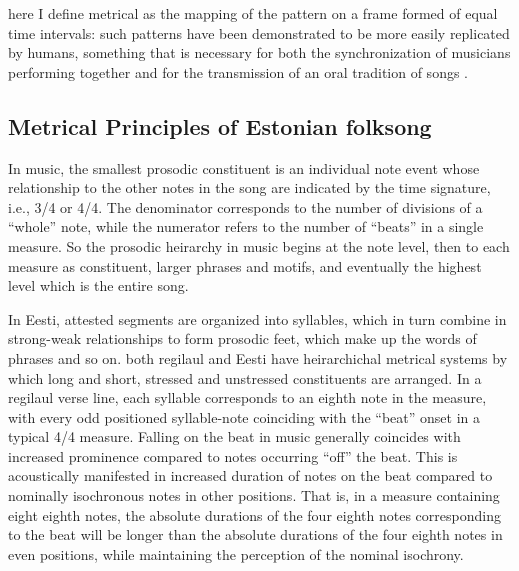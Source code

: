 here I define metrical as the mapping of the pattern on a frame formed of equal time intervals: such patterns have been demonstrated to be more easily replicated by humans, something that is necessary for both the synchronization of musicians performing together and for the transmission of an oral tradition of songs \citep{essensPovel1985}. 

%
%


\subsection{Metrical Principles of Estonian folksong}


In music, the smallest prosodic constituent is an individual note event whose relationship to the other notes in the song are indicated by the time signature, i.e., 3/4 or 4/4. The denominator corresponds to the number of divisions of a ``whole'' note, while the numerator refers to the number of ``beats'' in a single measure. So the prosodic heirarchy in music begins at the note level, then to each measure as constituent, larger phrases and motifs, and eventually the highest level which is the entire song. 

In Eesti, attested segments are organized into syllables, which in turn combine in strong-weak relationships to form prosodic feet, which make up the words of phrases and so on. 
both regilaul and Eesti have heirarchichal metrical systems by which long and short, stressed and unstressed constituents are arranged. 
 In a regilaul verse line, each syllable corresponds to an eighth note in the measure, with every odd positioned syllable-note coinciding with the ``beat'' onset in a typical 4/4 measure. Falling on the beat in music generally coincides with increased prominence compared to notes occurring ``off'' the beat. This is acoustically manifested in increased duration of notes on the beat compared to nominally isochronous notes in other positions. That is, in a measure containing eight eighth notes, the absolute durations of the four eighth notes corresponding to the beat will be longer than the absolute durations of the four eighth notes in even positions, while maintaining the perception of the nominal isochrony. 


